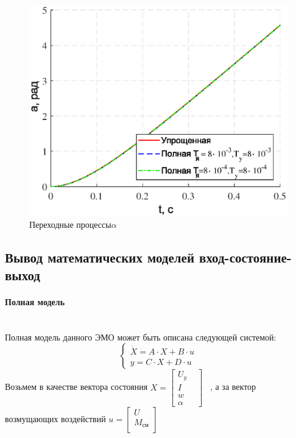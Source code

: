 \documentclass[a4paper,12pt]{article}
\begin{document}
			\begin{figure}[h!]
				\centering
				\includegraphics[width=5in]{comparea.eps}
				\caption{Переходные процессы$\alpha$}
				\label{s_9}
			
	\end{figure}
	\newpage
	\begin{center}
	\section{Вывод математических моделей вход-состояние-выход}
	\end{center}
	\paragraph{Полная модель}~\\
	Полная модель данного ЭМО может быть описана следующей системой:\\
	\begin{equation}
	\begin{cases}
	\dot{X}=A\cdot X + B\cdot u 
	\\
	y = C\cdot X + D\cdot u
	\end{cases}
	\end{equation}
	Возьмем в качестве вектора состояния $X=\begin{bmatrix}
	U_y & \\
	I &\\
	w &\\
	\alpha
	\end{bmatrix}$
	~, а за вектор возмущающих воздействий $u=\begin{bmatrix}
	U \\
	M_{\text{см}}\\ \end{bmatrix}$ \\
	
\end{document}
